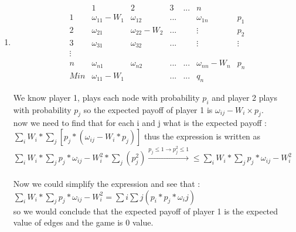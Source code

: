         \begin{enumerate}
            \item \phantom{text}
            \begin{latin}
                \begin{center}
                    \begin{equation*}
                                \begin{matrix}
                                      & & 1 & 2 & 3 & ...       & n            \\
                                    & 1 & \omega_{11} - W_1 & \omega_{12} & ... &     & \omega_{1n}  & p_1         \\
                                    & 2 & \omega_{21} & \omega_{22} - W_2 & ... &      & \vdots & p_2   \\
                                    & 3 & \omega_{31} & \omega_{32} & ... &      & \vdots & \vdots\\
                                    & \vdots \\
                                    & n & \omega_{n1} & \omega_{n2} & ... & ...  & \omega_{nn} - W_n  & p_n \\
                                    & Min & \omega_{11} - W_1 &  & ... & ...   & q_n 
                                    \end{matrix}
                                \end{equation*}
                           \end{center}
            We know player 1, plays each node with probability $p_i$ and player 2 plays with probability $p_j$ so the expected payoff of player 1 is 
            $\omega_{ij} - W_i \times p_j$. \\
            now we need to find that for each i and j what is the expected payoff : \\
            $\sum_i{W_i * \sum_j[p_j * (\omega_{ij}-W_i*p_j)]}$ thus the expression is written as $\sum_i{W_i * \sum_j{p_j*\omega_{ij}}-W_i^2*\sum_j(p_j^2)} 
            \xrightarrow{p_j \leq 1 \rightarrow p_j^2 \leq 1} \leq \sum_i{W_i * \sum_j{p_j * \omega_{ij}}-W_i^2}$\\ \\
            Now we could simplify the expression and see that : \\
            $\sum_i{W_i * \sum_j{p_j*\omega_{ij}}-W_i^2} = \sum{i}\sum{j}(p_i * p_j * \omega_ij)$\\
            so we would conclude that the expected payoff of player 1 is the expected value of edges and the game is 0 value.

\end{latin}
\end{enumerate}
